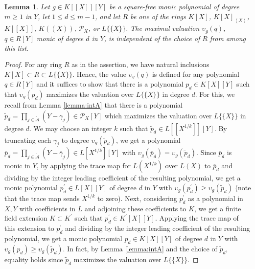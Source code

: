 \documentclass[a4paper,11pt]{amsart}%
\theoremstyle{definition}
\theoremstyle{plain}
\newtheorem{lemma}[defn]{Lemma}
\theoremstyle{remark}
\begin{document}
\begin{lemma}
\label{same exp} Let $g\in K[[X]][Y]$ be a square-free monic polynomial of degree
$m\geq 1$ in $Y$, let $1\leq d \leq m-1$, and let $R$ be one of the rings $K[X]$,
$K[X]_{\left\langle X\right\rangle }$, $K[[X]]$, $K((X))$, ${\mathcal{P}_{X}}$, or $L\{\{X\}\}$.
The maximal valuation $\upsilon_{g}(q)$, $q\in R[Y]$ monic of degree $d$ in $Y$, is
independent of the choice of $R$ from among this list.
\end{lemma}
\begin{proof}
For any ring $R$ as in the assertion, we have natural inclusions $K[X]\subset R \subset L\{\{X\}\}$.
Hence, the value $\upsilon_{g}(q)$  is defined for any polynomial $q\in R[Y]$ and it suffices to show that
there is a polynomial $p_d\in K[X][Y]$ such that $\upsilon_{g}(p_d)$ maximizes the valuation over $L\{\{X\}\}$
in degree $d$. For this, we recall from Lemma \ref{lemma:intA} that there is a polynomial
$\widetilde{p}_d=\prod_{j\in\widetilde{\mathcal{A}}}(Y-\gamma_{j}) \in \mathcal{P}_{X}[Y]$
which maximizes the valuation over $L\{\{X\}\}$ in degree $d$. We may choose an
integer $k$ such that $\widetilde{p}_d\in L[[X^{1/k}]][Y]$. By truncating each
$\gamma_{j}$ to degree $\upsilon_{g}(\widetilde{p}_d)$, we get a polynomial $\overline
{p}_d = \prod_{j\in\widetilde{\mathcal{A}}}(Y-\overline{\gamma}_{j}) \in L[X^{1/k}][Y]$ with $\upsilon_{g}(\overline{p}_d)
= \upsilon_{g}(\widetilde{p}_d)$. Since $\overline{p}_d$ is monic in $Y$, by applying the trace map for
$L(X^{1/k})$ over $L(X)$ to $\overline{p}_d$ and dividing by the integer leading coefficient of the resulting
polynomial, we get a monic polynomial $p_d^\prime\in L[X][Y]$ of degree $d$ in $Y$ with $\upsilon_{g}({p_{d}^\prime})
\geq  \upsilon_{g}(\widetilde{p}_d)$ (note that the trace map sends $X^{1/k}$ to zero).
Next, considering $p_d^\prime$ as a polynomial in $X, Y$ with coefficients in $L$ and
adjoining these coefficients to $K$, we get a finite field extension $K \subset K^\prime$ such that
$p_d^\prime \in K^\prime[X][Y]$. Applying the trace map of this extension to $p_d^\prime$ and
dividing by the integer leading coefficient of the resulting polynomial, we get a monic polynomial
$p_d\in K[X][Y]$ of degree $d$ in $Y$ with $\upsilon_{g}({p_d}) \geq  \upsilon_{g}(\widetilde{p}_d)$.
In fact, by Lemma \ref{lemma:intA} and the choice of $\widetilde{p}_d$, equality holds since
$\widetilde{p}_d$ maximizes the valuation over $L\{\{X\}\}$.
\end{proof}
\end{document}
